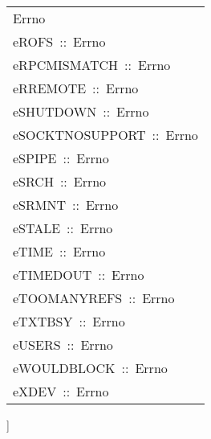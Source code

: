 \begin{haddockdesc}
\begin{tabular}{@{}l}
Errno\\eROFS\ ::\ Errno\\eRPCMISMATCH\ ::\ Errno\\eRREMOTE\ ::\ Errno\\eSHUTDOWN\ ::\ Errno\\eSOCKTNOSUPPORT\ ::\ Errno\\eSPIPE\ ::\ Errno\\eSRCH\ ::\ Errno\\eSRMNT\ ::\ Errno\\eSTALE\ ::\ Errno\\eTIME\ ::\ Errno\\eTIMEDOUT\ ::\ Errno\\eTOOMANYREFS\ ::\ Errno\\eTXTBSY\ ::\ Errno\\eUSERS\ ::\ Errno\\eWOULDBLOCK\ ::\ Errno\\eXDEV\ ::\ Errno
\end{tabular}]
\end{haddockdesc}
